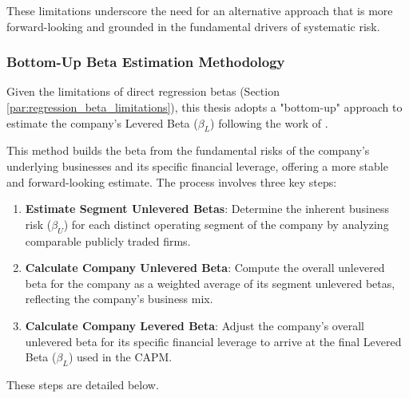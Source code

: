 These limitations underscore the need for an alternative approach that is more forward-looking and grounded in the fundamental drivers of systematic risk.

\subsubsection{Bottom-Up Beta Estimation Methodology} \label{sec:bottom_up_beta}
Given the limitations of direct regression betas (Section \ref{par:regression_beta_limitations}), this thesis adopts a "bottom-up" approach to estimate the company's Levered Beta (\(\beta_L\)) following the work of \textcite{damodaran_risk_parameters}.

This method builds the beta from the fundamental risks of the company's underlying businesses and its specific financial leverage, offering a more stable and forward-looking estimate. The process involves three key steps:
\begin{enumerate}
    \item \textbf{Estimate Segment Unlevered Betas}: Determine the inherent business risk (\(\beta_U\)) for each distinct operating segment of the company by analyzing comparable publicly traded firms.
    \item \textbf{Calculate Company Unlevered Beta}: Compute the overall unlevered beta for the company as a weighted average of its segment unlevered betas, reflecting the company's business mix.
    \item \textbf{Calculate Company Levered Beta}: Adjust the company's overall unlevered beta for its specific financial leverage to arrive at the final Levered Beta (\(\beta_L\)) used in the CAPM.
\end{enumerate}
These steps are detailed below.


